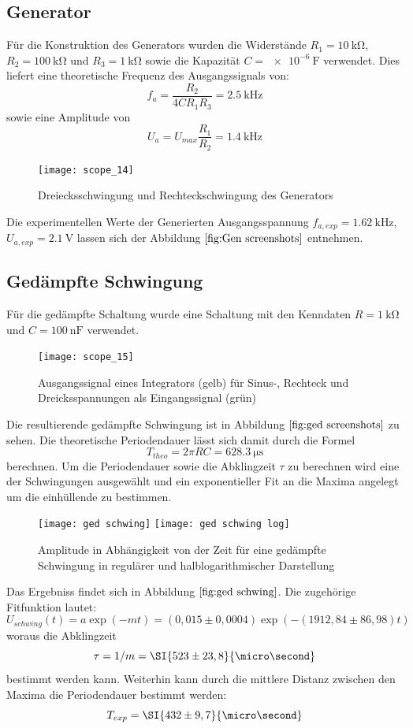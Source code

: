 \subsection{Generator}
Für die Konstruktion des Generators wurden die Widerstände $R_1=\SI{10}{\kilo\ohm}$, $R_2=\SI{100}{\kilo\ohm}$ und $R_3=\SI{1}{\kilo\ohm}$ sowie die Kapazität $C=\SI{e-6}{\farad}$ verwendet. Dies liefert eine theoretische Frequenz des Ausgangssignals von:
\begin{equation}
f_a=\frac{R_2}{4CR_1R_3}=\SI{2,5}{\kilo\hertz}
\end{equation}
sowie eine Amplitude von
\begin{equation}
U_a=U_{max}\frac{R_1}{R_2}=\SI{1,4}{\kilo\hertz}
\end{equation}
\begin{figure}
\centering
\texttt{[image: scope\_14]}
\label{fig:Gen screenshots}
\caption{Dreiecksschwingung und Rechteckschwingung des Generators}
\end{figure}
Die experimentellen Werte der Generierten Ausgangsspannung $f_{a,exp}=\SI{1,62}{\kilo\hertz}$, $U_{a,exp}=\SI{2,1}{\volt}$ lassen sich der Abbildung $\ref{fig:Gen screenshots}$ entnehmen. 
\subsection{Gedämpfte Schwingung}
Für die gedämpfte Schaltung wurde eine Schaltung mit den Kenndaten $R=\SI{1}{\kilo\ohm}$ und $C=\SI{100}{\nano\farad}$ verwendet.
\begin{figure}
\centering
\texttt{[image: scope\_15]}
\label{fig:ged screenshots}
\caption{Ausgangssignal eines Integrators (gelb) für Sinus-, Rechteck und Dreicksspannungen als Eingangssignal (grün)}
\end{figure}
Die resultierende gedämpfte Schwingung ist in Abbildung $\ref{fig:ged screenshots}$ zu sehen. Die theoretische Periodendauer lässt sich damit durch die Formel
\begin{equation}
T_{theo}=2\pi RC=\SI{628,3}{\micro\second}
\end{equation}
berechnen. Um die Periodendauer sowie die Abklingzeit $\tau$ zu berechnen wird eine der Schwingungen ausgewählt und ein exponentieller Fit an die Maxima angelegt um die einhüllende zu bestimmen.
\begin{figure}
\centering
\texttt{[image: ged schwing]}
\texttt{[image: ged schwing log]}
\label{fig:ged schwing}
\caption{Amplitude in Abhängigkeit von der Zeit für eine gedämpfte Schwingung in regulärer und halblogarithmischer Darstellung}
\end{figure}
Das Ergebniss findet sich in Abbildung $\ref{fig:ged schwing}$. Die zugehörige Fitfunktion lautet:
\begin{equation}
U_{schwing}(t)=a\exp(-mt)=(0,015\pm0,0004)\exp(-(1912,84\pm86,98)t)
\end{equation}
woraus die Abklingzeit
\begin{equation}
\tau=1/m=\SI{523\pm23,8}{\micro\second}
\end{equation}
bestimmt werden kann. Weiterhin kann durch die mittlere Distanz zwischen den Maxima die Periodendauer bestimmt werden:
\begin{equation}
T_{exp}=\SI{432\pm9,7}{\micro\second}
\end{equation}
